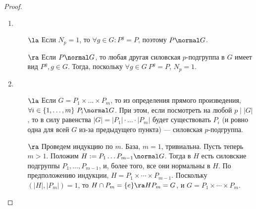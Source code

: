 \begin{proof}~
	\begin{enumerate}
		\item \begin{itemize}
			\item[$\la$] Если $N_p = 1$, то $\forall g \in G: P^g = P$, поэтому $P \normal G$.
			
			\item[$\ra$] Если $P \normal G$, то любая другая силовская $p$-подгруппа в $G$ имеет вид $P^g, g \in G$. Тогда, поскольку $\forall g \in G\ P^g = P$, $N_p = 1$.
		\end{itemize}
		
		\item \begin{itemize}
			\item[$\la$] Если $G = P_1 \times \ldots \times P_m$, то из определения прямого произведения, $\forall i \in \{1, \ldots, m\}\ P_i \normal G$. При этом, если посмотреть на любой $p \mid |G|$, то в силу равенства $|G| = |P_1| \cdot \ldots \cdot |P_m|$ будет существовать $P_i$ (и ровно одна для всей $G$ из-за предыдущего пункта) --- силовская $p$-подгруппа.
			
			\item[$\ra$] Проведем индукцию по $m$. База, $m = 1$, тривиальна. Пусть теперь $m > 1$. Положим $H := P_1\dots P_{m - 1} \normal G$. Тогда в $H$ есть силовские подгруппы $P_1, \ldots, P_{m - 1}$, и, более того, все они нормальны в $H$. По предположению индукции, $H = P_1 \times \dotsb \times P_{m-1}$. Поскольку $(|H|, |P_m|) = 1$, то $H \cap P_m = \{e\} \ra HP_m = G$, и $G = P_1 \times \dotsb \times P_m$.
		\end{itemize}
	\end{enumerate}
\end{proof}